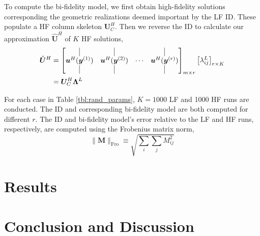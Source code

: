 \documentclass[11pt]{article}
\begin{document}
To compute the bi-fidelity model, we first obtain high-fidelity solutions corresponding the geometric realizations deemed important by the LF ID. These populate a HF column skeleton $\bm{U}^H_C$. Then we reverse the ID to calculate our approximation $\hat{\bm{U}}^H$ of $K$ HF solutions,
\begin{equation}
\begin{aligned}
\hat{\bm{U}}^H
&=
\begin{bmatrix}
\vline & \vline & & \vline \\
\bm{u}^H(\bm{y}^{(1)}) & \bm{u}^H(\bm{y}^{(2)}) & \cdots & \bm{u}^H(\bm{y}^{(r)}) \\
\vline & \vline & & \vline
\end{bmatrix}_{m \times r}
\begin{bmatrix}
\lambda^L_{ij}
\end{bmatrix}_{r \times K}
\\
&= \bm{U}^H_C \bm{\Lambda}^L
\end{aligned}
\end{equation}

For each case in Table \ref{tbl:rand_params}, $K=1000$ LF and 1000 HF runs are conducted. The ID and corresponding bi-fidelity model are both computed for different $r$. The ID and bi-fidelity model's error relative to the LF and HF runs, respectively, are computed using the Frobenius matrix norm,
\begin{equation}
\| \bm{M} \|_\text{Fro} \equiv \sqrt{\sum_i \sum_j M_{ij}^2}
\end{equation}

\section{Results}


\section{Conclusion and Discussion}


\label{lastpage}
\end{document}
